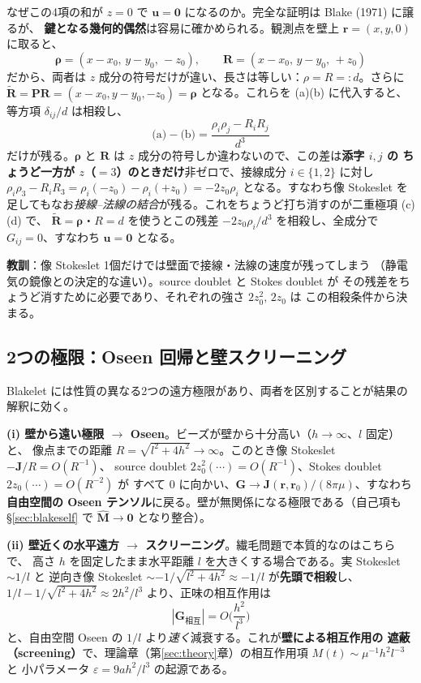 \documentclass[11pt,a4paper]{article}
\newcommand{\rv}{\bm{r}}
\begin{document}
なぜこの4項の和が $z=0$ で $\bm u=\bm 0$ になるのか。完全な証明は Blake (1971) に譲るが、
\textbf{鍵となる幾何的偶然}は容易に確かめられる。観測点を壁上 $\rv=(x,y,0)$ に取ると、
\begin{equation}
\bm\rho=(x-x_0,\,y-y_0,\,-z_0),\qquad
\bm R=(x-x_0,\,y-y_0,\,+z_0)
\end{equation}
だから、両者は $z$ 成分の符号だけが違い、長さは等しい：$\rho=R=:d$。さらに
$\tilde{\bm R}=\bm P\bm R=(x-x_0,y-y_0,-z_0)=\bm\rho$ となる。これらを (a)(b) に代入すると、
等方項 $\delta_{ij}/d$ は相殺し、
\begin{equation}
\text{(a)}-\text{(b)}=\frac{\rho_i\rho_j-R_iR_j}{d^3}
\end{equation}
だけが残る。$\bm\rho$ と $\bm R$ は $z$ 成分の符号しか違わないので、この差は\textbf{添字 $i,j$ の
ちょうど一方が $z$（$=3$）のときだけ}非ゼロで、接線成分 $i\in\{1,2\}$ に対し
$\rho_i\rho_3-R_iR_3=\rho_i(-z_0)-\rho_i(+z_0)=-2z_0\rho_i$ となる。すなわち像 Stokeslet
を足してもなお\emph{接線--法線の結合}が残る。これをちょうど打ち消すのが二重極項 (c)(d) で、
$\tilde{\bm R}=\bm\rho$・$R=d$ を使うとこの残差 $-2z_0\rho_i/d^3$ を相殺し、全成分で
$G_{ij}=0$、すなわち $\bm u=\bm 0$ となる。

\begin{keybox}
\textbf{教訓}：像 Stokeslet 1個だけでは壁面で接線・法線の速度が残ってしまう
（静電気の鏡像との決定的な違い）。source doublet と Stokes doublet が
その残差をちょうど消すために必要であり、それぞれの強さ $2z_0^2,\,2z_0$ は
この相殺条件から決まる。
\end{keybox}

\subsection{2つの極限：Oseen 回帰と壁スクリーニング}\label{sec:blakelimits}

Blakelet には性質の異なる2つの遠方極限があり、両者を区別することが結果の解釈に効く。

\textbf{(i) 壁から遠い極限 $\to$ Oseen}。ビーズが壁から十分高い（$h\to\infty$、$l$ 固定）と、
像点までの距離 $R=\sqrt{l^2+4h^2}\to\infty$。このとき像 Stokeslet $-\bm J/R=O(R^{-1})$、
source doublet $2z_0^2(\cdots)=O(R^{-1})$、Stokes doublet $2z_0(\cdots)=O(R^{-2})$ が
すべて $0$ に向かい、$\bm G\to\bm J(\rv,\rv_0)/(8\pi\mu)$、すなわち\textbf{自由空間の
Oseen テンソル}に戻る。壁が無関係になる極限である（自己項も §\ref{sec:blakeself} で
$\widehat{\bm M}\to\bm 0$ となり整合）。

\textbf{(ii) 壁近くの水平遠方 $\to$ スクリーニング}。繊毛問題で本質的なのはこちらで、
高さ $h$ を固定したまま水平距離 $l$ を大きくする場合である。実 Stokeslet $\sim1/l$ と
逆向き像 Stokeslet $\sim-1/\sqrt{l^2+4h^2}\approx-1/l$ が\textbf{先頭で相殺}し、
$1/l-1/\sqrt{l^2+4h^2}\approx2h^2/l^3$ より、正味の相互作用は
\begin{equation}
|\bm G_{\text{相互}}|=O\!\Big(\frac{h^2}{l^3}\Big)
\end{equation}
と、自由空間 Oseen の $1/l$ より\emph{速く}減衰する。これが\textbf{壁による相互作用の
遮蔽（screening）}で、理論章（第\ref{sec:theory}章）の相互作用項 $M(t)\sim\mu^{-1}h^2l^{-3}$ と
小パラメータ $\varepsilon=9ah^2/l^3$ の起源である。
\end{document}
